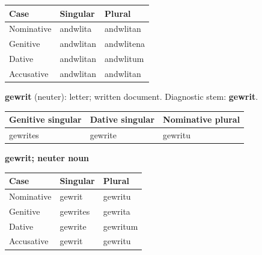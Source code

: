 \par\begingroup
\fontsize{10.5}{13.2}\selectfont
\setlength{\LTleft}{0pt}\setlength{\LTright}{\fill}
\noindent
\begin{tabular}{@{}>{\raggedright\arraybackslash}p{39.46mm}>{\raggedright\arraybackslash}p{39.46mm}>{\raggedright\arraybackslash}p{39.46mm}@{}}
\toprule
\textbf{Case} & \textbf{Singular} & \textbf{Plural} \\
\midrule
Nominative & andwlita & andwlitan \\
Genitive & andwlitan & andwlitena \\
Dative & andwlitan & andwlitum \\
Accusative & andwlitan & andwlitan \\
\bottomrule
\end{tabular}
\par\endgroup

\textbf{gewrit} (neuter): letter; written document. Diagnostic stem: \textbf{gewrit}.

\par\begingroup
\fontsize{10.5}{13.2}\selectfont
\setlength{\LTleft}{0pt}\setlength{\LTright}{\fill}
\noindent
\begin{tabular}{@{}>{\raggedright\arraybackslash}p{39.24mm}>{\raggedright\arraybackslash}p{36.31mm}>{\raggedright\arraybackslash}p{42.82mm}@{}}
\toprule
\textbf{Genitive singular} & \textbf{Dative singular} & \textbf{Nominative plural} \\
\midrule
gewrites & gewrite & gewritu \\
\bottomrule
\end{tabular}
\par\endgroup

\textbf{gewrit; neuter noun}

\par\begingroup
\fontsize{10.5}{13.2}\selectfont
\setlength{\LTleft}{0pt}\setlength{\LTright}{\fill}
\noindent
\begin{tabular}{@{}>{\raggedright\arraybackslash}p{39.46mm}>{\raggedright\arraybackslash}p{39.46mm}>{\raggedright\arraybackslash}p{39.46mm}@{}}
\toprule
\textbf{Case} & \textbf{Singular} & \textbf{Plural} \\
\midrule
Nominative & gewrit & gewritu \\
Genitive & gewrites & gewrita \\
Dative & gewrite & gewritum \\
Accusative & gewrit & gewritu \\
\bottomrule
\end{tabular}
\par\endgroup

